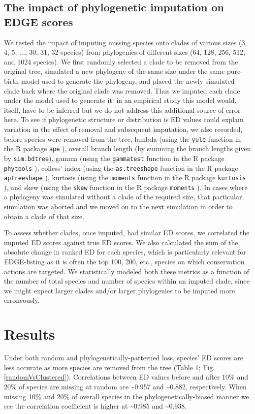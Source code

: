 \documentclass[12pt,english]{article}
\begin{document}
\subsection*{The impact of phylogenetic imputation on EDGE scores}
We tested the impact of imputing missing species onto clades of various sizes
(3, 4, 5, ..., 30, 31, 32 species) from phylogenies of different sizes (64, 128,
256, 512, and 1024 species). We first randomly selected a clade to be removed
from the original tree, simulated a new phylogeny of the same size under the
same pure-birth model used to generate the phylogeny, and placed the newly
simulated clade back where the original clade was removed. Thus we imputed each
clade under the model used to generate it: in an empirical study this model
would, itself, have to be inferred but we do not address this additional source
of error here. To see if phylogenetic structure or distribution is ED values
could explain variation in the effect of removal and subsequent imputation, we
also recorded, before species were removed from the tree, lambda (using the
\texttt{yule} function in the R package \texttt{ape} \autocite{Paradis2017}),
overall branch length (by summing the branch lengths given by
\texttt{sim.bdtree}), gamma (using the \texttt{gammatest} function in the R
package \texttt{phytools} \autocite{Revell2017}), colless' index (using the
\texttt{as.treeshape} function in the R package \texttt{apTreeshape}
\autocite{Bortolussi2009}), kurtosis (using the \texttt{moments} function in the
R package \texttt{kurtosis} \autocite{Komsta2015}), and skew (using the
\texttt{skew} function in the R package \texttt{moments} \autocite{Komsta2015}).
In cases where a phylogeny was simulated without a clade of the required size,
that particular simulation was aborted and we moved on to the next simulation in
order to obtain a clade of that size.

To assess whether clades, once imputed, had similar ED scores, we correlated the
imputed ED scores against true ED scores. We also calculated the sum of the
absolute change in ranked ED for each species, which is particularly relevant
for EDGE-listing as it is often the top 100, 200, etc., species on which
conservation actions are targeted. We statistically modeled both these metrics
as a function of the number of total species and number of species within an
imputed clade, since we might expect larger clades and/or larger phylogenies to
be imputed more erroneously.

\section*{Results}
Under both random and phylogenetically-patterned loss, species' ED scores are
less accurate as more species are removed from the tree (Table 1; Fig.
\ref{randomVsClustered}). Correlations between ED values before and after 10\%
and 20\% of species are missing at random are \textasciitilde 0.957 and
\textasciitilde 0.882, respectively. When missing 10\% and 20\% of overall
species in the phylogenetically-biased manner we see the correlation coefficient
is higher at \textasciitilde 0.985 and \textasciitilde 0.938.
\end{document}
